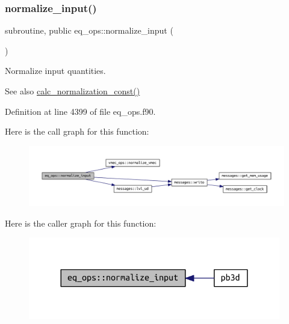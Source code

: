 \subsubsection{\texorpdfstring{normalize\+\_\+input()}{normalize\_input()}}
{\footnotesize\ttfamily subroutine, public eq\+\_\+ops\+::normalize\+\_\+input (\begin{DoxyParamCaption}{ }\end{DoxyParamCaption})}



Normalize input quantities. 

\begin{DoxySeeAlso}{See also}
\hyperlink{namespaceeq__ops_a7cd38586e386e1bc684a327ebcc4c1de}{calc\+\_\+normalization\+\_\+const()} 
\end{DoxySeeAlso}


Definition at line 4399 of file eq\+\_\+ops.\+f90.

Here is the call graph for this function\+:\nopagebreak
\begin{figure}[H]
\begin{center}
\leavevmode
\includegraphics[width=350pt]{namespaceeq__ops_a1b4c764da73624722d7e76498a2b80a9_cgraph}
\end{center}
\end{figure}
Here is the caller graph for this function\+:\nopagebreak
\begin{figure}[H]
\begin{center}
\leavevmode
\includegraphics[width=312pt]{namespaceeq__ops_a1b4c764da73624722d7e76498a2b80a9_icgraph}
\end{center}
\end{figure}
\mbox{\label{namespaceeq__ops_a8082c12510696bd8ffdd0deef41860c2}} 
